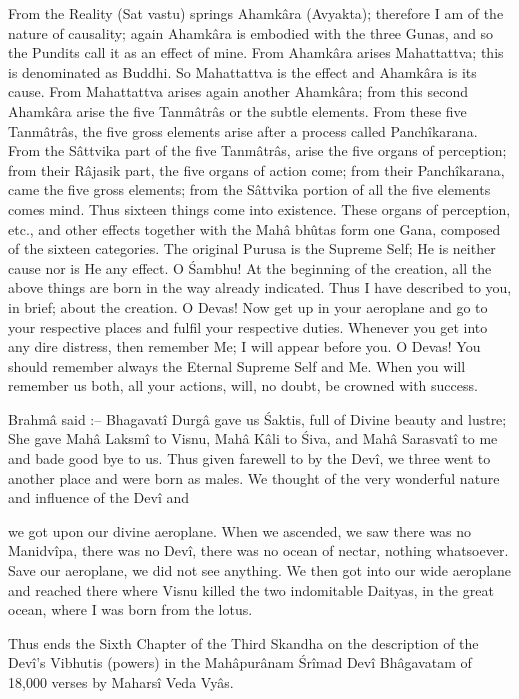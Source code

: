 From the Reality (Sat vastu) springs Ahamk\^ara (Avyakta); therefore I am of the nature of causality; again Ahamk\^ara is embodied with the three Gunas, and so the Pundits call it as an effect of mine. From Ahamk\^ara arises Mahattattva; this is denominated as Buddhi. So Mahattattva is the effect and Ahamk\^ara is its cause. From Mahattattva arises again another Ahamk\^ara; from this second Ahamk\^ara arise the five Tanm\^atr\^as or the subtle elements. From these five Tanm\^atr\^as, the five gross elements arise after a process called Panch\^ikarana. From the S\^attvika part of the five Tanm\^atr\^as, arise the five organs of perception; from their R\^ajasik part, the five organs of action come; from their Panch\^ikarana, came the five gross elements; from the S\^attvika portion of all the five elements comes mind. Thus sixteen things come into existence. These organs of perception, etc., and other effects together with the Mah\^a bhûtas form one Gana, composed of the sixteen categories. The original Purusa is the Supreme Self; He is neither cause nor is He any effect. O \'Sambhu! At the beginning of the creation, all the above things are born in the way already indicated. Thus I have described to you, in brief; about the creation. O Devas! Now get up in your aeroplane and go to your respective places and fulfil your respective duties. Whenever you get into any dire distress, then remember Me; I will appear before you. O Devas! You should remember always the Eternal Supreme Self and Me. When you will remember us both, all your actions, will, no doubt, be crowned with success.

Brahm\^a said :-- Bhagavat\^i Durg\^a gave us \'Saktis, full of Divine beauty and lustre; She gave Mah\^a Laksm\^i to Visnu, Mah\^a K\^ali to \'Siva, and Mah\^a Sarasvat\^i to me and bade good bye to us. Thus given farewell to by the Dev\^i, we three went to another place and were born as males. We thought of the very wonderful nature and influence of the Dev\^i and

we got upon our divine aeroplane. When we ascended, we saw there was no Manidv\^ipa, there was no Dev\^i, there was no ocean of nectar, nothing whatsoever. Save our aeroplane, we did not see anything. We then got into our wide aeroplane and reached there where Visnu killed the two indomitable Daityas, in the great ocean, where I was born from the lotus.

Thus ends the Sixth Chapter of the Third Skandha on the description of the Dev\^i's Vibhutis (powers) in the Mah\^apur\^anam \'Sr\^imad Dev\^i Bh\^agavatam of 18,000 verses by Mahars\^i Veda Vy\^as.